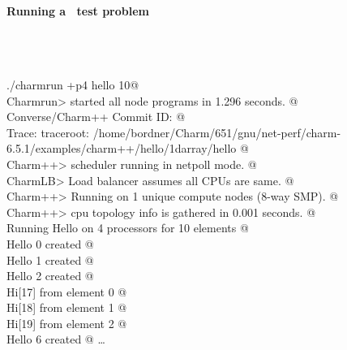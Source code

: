 
\begin{frame}[fragile] 
\secframetitle{\ssInstallCharm}
\framesubtitle{Running a \charm\ test problem}
\color{black}
\footnotesize

\prompt{}\\\pause
\prompt{}\\\pause

\color{blue}
\verb@ ./charmrun +p4 hello 10@ \\
\color{black}
\verb@	Charmrun> started all node programs in 1.296 seconds. @ \\
\verb@	Converse/Charm++ Commit ID:  @ \\
\verb@	Trace: traceroot: /home/bordner/Charm/651/gnu/net-perf/charm-6.5.1/examples/charm++/hello/1darray/hello @ \\
\verb@	Charm++> scheduler running in netpoll mode. @ \\
\verb@	CharmLB> Load balancer assumes all CPUs are same. @ \\
\verb@	Charm++> Running on 1 unique compute nodes (8-way SMP). @ \\
\verb@	Charm++> cpu topology info is gathered in 0.001 seconds. @ \\
\verb@	Running Hello on 4 processors for 10 elements @ \\
\verb@	Hello 0 created @ \\
\verb@	Hello 1 created @ \\
\verb@	Hello 2 created @ \\
\verb@	Hi[17] from element 0 @ \\
\verb@	Hi[18] from element 1 @ \\
\verb@	Hi[19] from element 2 @ \\
\verb@	Hello 6 created @ \ldots
\end{frame}

\usebackgroundtemplate
{}

